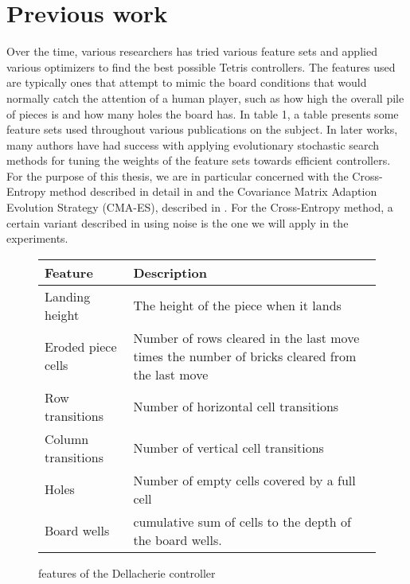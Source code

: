 \section{Previous work}

Over the time, various researchers has tried various feature 
sets and applied various optimizers to find the best 
possible Tetris controllers. The features used are typically
ones that attempt to mimic the board conditions that would
normally catch the attention of a human player, such as
how high the overall pile of pieces is and how many holes 
the board has. In \cite{scherrer2009:b} table 1, a table 
presents some feature sets used throughout various publications
on the subject. In later works, many authors have had success
with applying evolutionary stochastic search methods for tuning 
the weights of the feature sets towards
efficient controllers. For the purpose of this thesis,
we are in particular concerned with the 
Cross-Entropy method described in detail in \citep{cetut2014} and the
Covariance Matrix Adaption Evolution Strategy (CMA-ES), described 
in \cite{hansen2011}. For the Cross-Entropy method,
a certain variant described in \cite{szita:06} using noise
is the one we will apply in the experiments.\\

\begin{figure}[h!]
\begin{center}
\begin{tabular}{| l | p{8cm} |}
\hline
\textbf{Feature} & \textbf{Description}\\
\hline
Landing height & The height of the piece when it lands\\
\hline
Eroded piece cells & Number of rows cleared in the last move
times the number of bricks cleared from the last move\\
\hline
Row transitions & Number of horizontal cell transitions\\
\hline
Column transitions & Number of vertical cell transitions \\
\hline
Holes & Number of empty cells covered by a full cell\\
\hline
Board wells & cumulative sum of cells to the depth of
the board wells.\\
\hline
\end{tabular}
\end{center}
\caption{features of the Dellacherie controller \label{table:dellfeat}}
\end{figure}

